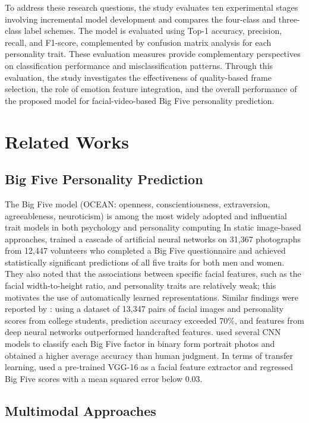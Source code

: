 \documentclass[10pt,a4paper,twocolumn]{article}
\begin{document}
To address these research questions, the study evaluates ten experimental stages involving incremental model development and compares the four-class and three-class label schemes. The model is evaluated using Top-1 accuracy, precision, recall, and F1-score, complemented by confusion matrix analysis for each personality trait. These evaluation measures provide complementary perspectives on classification performance and misclassification patterns. Through this evaluation, the study investigates the effectiveness of quality-based frame selection, the role of emotion feature integration, and the overall performance of the proposed model for facial-video-based Big Five personality prediction.

\section{Related Works}
\subsection{Big Five Personality Prediction}

The Big Five model (OCEAN: openness, conscientiousness, extraversion, agreeableness, neuroticism) is among the most widely adopted and influential trait models in both psychology and personality computing \cite{Jacques} In static image-based approaches, \cite{Kachur} trained a cascade of artificial neural networks on 31,367 photographs from 12,447 volunteers who completed a Big Five questionnaire and achieved statistically significant predictions of all five traits for both men and women. They also noted that the associations between specific facial features, such as the facial width-to-height ratio, and personality traits are relatively weak; this motivates the use of automatically learned representations. Similar findings were reported by \cite{BigFive}: using a dataset of 13,347 pairs of facial images and personality scores from college students, prediction accuracy exceeded 70\%, and features from deep neural networks outperformed handcrafted features. \cite{Moreno} used several CNN models to classify each Big Five factor in binary form portrait photos and obtained a higher average accuracy than human judgment. In terms of transfer learning, \cite{Ilmini} used a pre-trained VGG-16 as a facial feature extractor and regressed Big Five scores with a mean squared error below 0.03.

\subsection{Multimodal Approaches}
\end{document}
